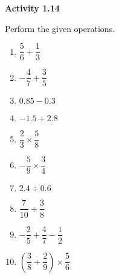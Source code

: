 \vspace{0.3ex}
\noindent\textbf{Activity 1.14}

\vspace{0.2ex}

Perform the given operations.
\begin{multicols}{2}
\begin{enumerate}
    \item \(\dfrac{5}{6} + \dfrac{1}{3}\)
    \item \( -\dfrac{4}{7} + \dfrac{3}{5}\)
    \item \(0.85 - 0.3\)
    \item \(-1.5 + 2.8\)
    \item \(\dfrac{2}{3} \times \dfrac{5}{8}\)
    \item \(-\dfrac{5}{9} \times \dfrac{3}{4}\)
    \item \(2.4 \div 0.6\)
    \item \(\dfrac{7}{10} \div \dfrac{3}{8}\)
    \item \(-\dfrac{2}{5} + \dfrac{4}{7} - \dfrac{1}{2}\)
    \item \(\left(\dfrac{3}{8} + \dfrac{2}{9} \right) \times \dfrac{5}{6}\)
\end{enumerate}
\end{multicols}
